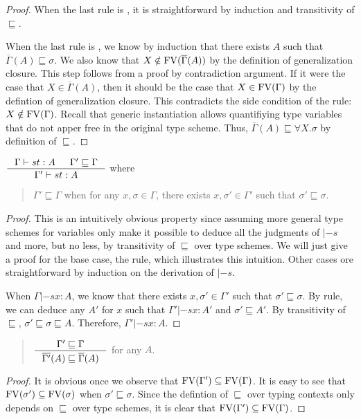 \begin{proof}
When the last rule is , it is straightforward by induction
and transitivity of $\sqsubseteq$.

When the last rule is , we know by induction that there exists
$A$ such that $\overline{\Gamma}(A) \sqsubseteq \sigma$. We also know
that $X \notin\mathop{\mathrm{FV}}(\overline{\Gamma}(A))$ by the definition of generalization closure.
This step follows from a proof by contradiction argument.
If it were the case that $X\in\overline{\Gamma}(A)$, then it should be the case that
$X\in\mathop{\mathrm{FV}}(\Gamma)$
by the defintion of generalization closure. This contradicts the side condition of
the  rule: $X\notin\mathop{\mathrm{FV}}(\Gamma)$.
Recall that generic instantiation allows quantifiying type variables
that do not apper free in the original type scheme. Thus,
$\overline{\Gamma}(A) \sqsubseteq \forall X.\sigma$ by definition
of $\sqsubseteq$.
\end{proof}

\begin{lemma} \label{lem:genGamma}
$ \inference{\Gamma |-s t : A & \Gamma' \sqsubseteq \Gamma}
	    {\Gamma' |-s t : A} $ where
\begin{quote}
$\Gamma' \sqsubseteq \Gamma$ when for any $x,\sigma\in \Gamma$,
there exists $x,\sigma'\in\Gamma'$ such that $\sigma'\sqsubseteq\sigma$.
\end{quote}
\label{lem:generalizeGamma}
\end{lemma}
\begin{proof}
This is an intuitively obvious property since assuming
more general type schemes for variables only make
it possible to deduce all the judgments of $|-s$ and more, but no less,
by transitivity of $\sqsubseteq$ over type schemes.
We will just give a proof for the base case, the  rule,
which illustrates this intuition.
Other cases ore straightforward by induction on the derivation of $|-s$.

When $\Gamma |-s x : A$, we know that there exists
$x,\sigma'\in\Gamma'$ such that $\sigma'\sqsubseteq\sigma$.
By  rule, we can deduce any $A'$ for $x$
such that $\Gamma' |-s x : A'$ and $\sigma'\sqsubseteq A'$.
By transitivity of $\sqsubseteq$, $\sigma' \sqsubseteq \sigma \sqsubseteq A$.
Therefore, $\Gamma' |-s x : A$.
\end{proof}

\begin{lemma}
\begin{quote}
$ \inference{\Gamma' \sqsubseteq \Gamma}
	    {\overline{\Gamma'}(A) \sqsubseteq \overline{\Gamma}(A)} $
for any $A$.
\end{quote}
\label{lem:closureMoreGen}
\end{lemma}
\begin{proof}
It is obvious once we observe that $\mathop{\mathrm{FV}}(\Gamma') \subseteq \mathop{\mathrm{FV}}(\Gamma)$.
It is easy to see that $\mathop{\mathrm{FV}}(\sigma') \subseteq \mathop{\mathrm{FV}}(\sigma)$
when $\sigma' \sqsubseteq \sigma$. Since the defintion of $\sqsubseteq$
over typing contexts only depends on $\sqsubseteq$ over type schemes,
it is clear that $\mathop{\mathrm{FV}}(\Gamma') \subseteq \mathop{\mathrm{FV}}(\Gamma)$.
\end{proof}

